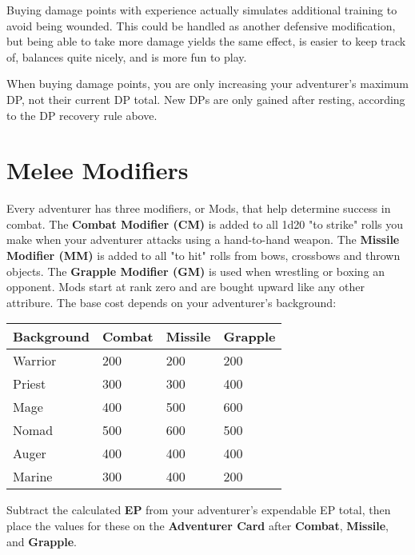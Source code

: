 \begin{multicols*}{2}
Buying damage points with experience actually simulates additional training to avoid being wounded. This could be handled as another defensive modification, but being able to take more damage yields the same effect, is easier to keep track of, balances quite nicely, and is more fun to play.

When buying damage points, you are only increasing your adventurer's maximum DP, not their current DP total. New DPs are only gained after resting, according to the DP recovery rule above.
\section{Melee Modifiers}
Every adventurer has three modifiers, or Mods, that help determine success in combat. The \textbf{Combat Modifier (CM)} is added to all 1d20 "to strike" rolls you make when
your adventurer attacks using a hand-to-hand weapon. The \textbf{Missile Modifier (MM)} is added to all "to hit" rolls from bows, crossbows and thrown objects. The \textbf{Grapple Modifier (GM)} is used when wrestling or boxing an opponent. Mods start at rank zero and are bought upward like any other attribure. The base cost depends on your adventurer's background:

\begin{tcolorbox}[breakable,boxrule=0pt,title=\textbf{Melee Modifier Costs}]
\begin{tabular}{l l l l}
\textbf{Background} & \textbf{Combat} & \textbf{Missile} & \textbf{Grapple}\\
\midrule
Warrior & 200 & 200 & 200\\
Priest & 300 & 300 & 400\\
Mage & 400 & 500 & 600\\
Nomad & 500 & 600 & 500\\
Auger & 400 & 400 & 400\\
Marine & 300 & 400 & 200\\
\end{tabular}
\end{tcolorbox}
Subtract the calculated \textbf{EP} from your adventurer's expendable EP total, then place the values for these on the \textbf{Adventurer Card} after \textbf{Combat}, \textbf{Missile}, and \textbf{Grapple}.

\end{multicols*}
